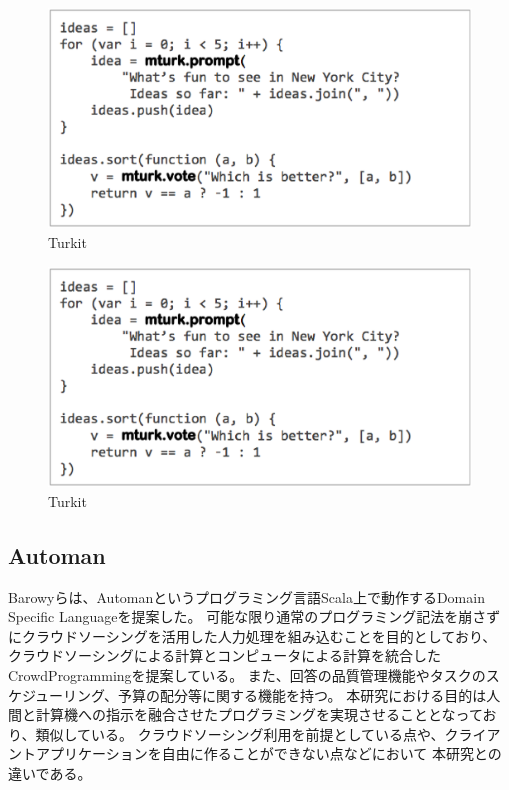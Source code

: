 \begin{figure}[htbp]
\centering
\includegraphics{images/turkit.eps}
\caption{Turkit \label{fig:turkit}}
\end{figure}

\begin{figure}[htbp]
  \begin{center}
  \includegraphics[width=.6\linewidth]{images/turkit.eps}
  \end{center}
  \caption{Turkit}
  \label{fig:turkit}
\end{figure}

\subsection{Automan}\label{automan}

Barowyらは、Automanというプログラミング言語Scala上で動作するDomain
Specific Languageを提案した\cite{automan}。
可能な限り通常のプログラミング記法を崩さずにクラウドソーシングを活用した人力処理を組み込むことを目的としており、
クラウドソーシングによる計算とコンピュータによる計算を統合したCrowdProgrammingを提案している。
また、回答の品質管理機能やタスクのスケジューリング、予算の配分等に関する機能を持つ。
本研究における目的は人間と計算機への指示を融合させたプログラミングを実現させることとなっており、類似している。
クラウドソーシング利用を前提としている点や、クライアントアプリケーションを自由に作ることができない点などにおいて
本研究との違いである。

